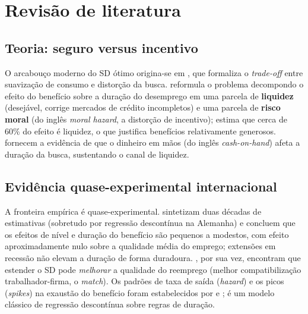 \documentclass[12pt,a4paper]{article}
\begin{document}
\section{Revisão de literatura}

\subsection{Teoria: seguro versus incentivo}
O arcabouço moderno do SD ótimo origina-se em \citet{baily1978optimal}, que formaliza o \textit{trade-off} entre suavização de consumo e distorção da busca. \citet{chetty2008moral} reformula o problema decompondo o efeito do benefício sobre a duração do desemprego em uma parcela de \textbf{liquidez} (desejável, corrige mercados de crédito incompletos) e uma parcela de \textbf{risco moral} (do inglês \textit{moral hazard}, a distorção de incentivo); estima que cerca de 60\% do efeito é liquidez, o que justifica benefícios relativamente generosos. \citet{cardchettyweber2007cash} fornecem a evidência de que o dinheiro em mãos (do inglês \textit{cash-on-hand}) afeta a duração da busca, sustentando o canal de liquidez.

\subsection{Evidência quase-experimental internacional}
A fronteira empírica é quase-experimental. \citet{schmiedervonwachter2016effects} sintetizam duas décadas de estimativas (sobretudo por regressão descontínua na Alemanha) e concluem que os efeitos de nível e duração do benefício são pequenos a modestos, com efeito aproximadamente nulo sobre a qualidade média do emprego; extensões em recessão não elevam a duração de forma duradoura. \citet{nekoeiweber2017does}, por sua vez, encontram que estender o SD pode \textit{melhorar} a qualidade do reemprego (melhor compatibilização trabalhador-firma, o \textit{match}). Os padrões de taxa de saída (\textit{hazard}) e os picos (\textit{spikes}) na exaustão do benefício foram estabelecidos por \citet{katzmeyer1990impact} e \citet{meyer1990unemployment}; \citet{lalive2008how} é um modelo clássico de regressão descontínua sobre regras de duração.
\end{document}
